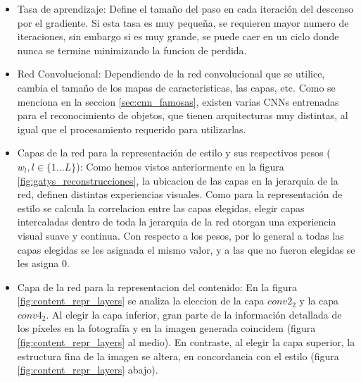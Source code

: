 \documentclass[a4paper,11pt,spanish]{book}
\begin{document}
\begin{itemize}
	 \item Tasa de aprendizaje: Define el tamaño del paso en cada iteración del descenso por el gradiente. Si esta tasa es muy pequeña, se requieren mayor numero 
	  de iteraciones, sin embargo si es muy grande, se puede caer en un ciclo donde nunca se termine minimizando la funcion de perdida. 
	 \item Red Convolucional: Dependiendo de la red convolucional que se utilice, cambia el tamaño de los mapas de caracteristicas, las capas, etc.
	  Como se menciona en la seccion \ref{sec:cnn_famosas}, existen varias CNNs entrenadas para el reconocimiento de objetos, que tienen arquitecturas
	  muy distintas, al igual que el procesamiento requerido para utilizarlas.
	 \item Capas de la red para la representación de estilo y sus respectivos pesos ($w_l, l \in \{1 \dots L\}$): Como hemos vistos anteriormente en la figura \ref{fig:gatys_reconstrucciones}, 
	 la ubicacion de las capas en la jerarquia de la red, definen distintas experiencias visuales. Como para la representación de estilo se calcula la correlacion entre las capas elegidas,
	 elegir capas intercaladas dentro de toda la jerarquia de la red otorgan una experiencia visual suave y continua.
	 Con respecto a los pesos, por lo general a todas las capas elegidas se les asignada el mismo valor, y a las que no fueron elegidas se les asigna 0.
	 \item Capa de la red para la representacion del contenido: En la figura \ref{fig:content_repr_layers} se analiza la eleccion de la capa $conv2_2$ y la capa $conv4_2$.
	 Al elegir la capa inferior, gran parte de la información detallada de los píxeles en la fotografía y en la imagen generada coincidem (figura \ref{fig:content_repr_layers} al medio).
	 En contraste, al elegir la capa superior, la estructura fina de la imagen se altera, en concordancia con el estilo (figura \ref{fig:content_repr_layers} abajo).
	 \begin{figure}[h]

\end{figure}
\end{itemize}
\end{document}
